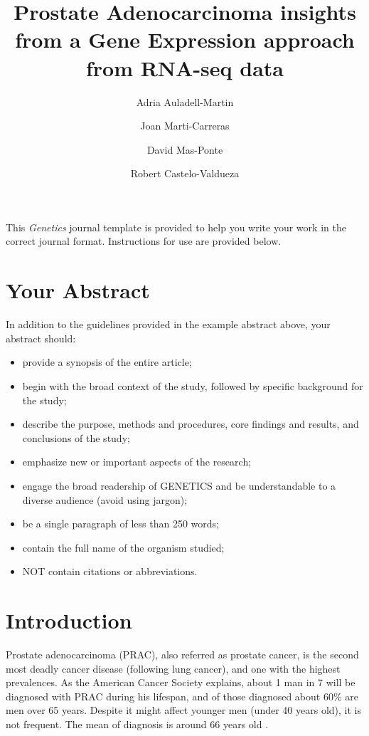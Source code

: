 \documentclass[9pt,twocolumn,twoside]{gsajnl}
\title{Prostate Adenocarcinoma insights from a Gene Expression approach from RNA-seq data}
\author[$\ast$,$\dagger$]{Adria Auladell-Martin}
\author[$\ast$,$\dagger$]{Joan Marti-Carreras}
\author[$\ast$,$\dagger$]{David Mas-Ponte}
\author[$\ast$,1]{Robert Castelo-Valdueza}
\affil[$\ast$]{M.Sc. in Bioinformatics at Department of Experimental and Health Sciences (CEXS), Universitat Pompeu Fabra}
\affil[$\dagger$]{Authors Contributed Equally to this work}
\begin{document}
\maketitle
\thispagestyle{firststyle}
\marginmark
\firstpagefootnote
{}
\vspace{-11pt}%

\lettrine[lines=2]{\color{color2}T}{}his \textit{Genetics} journal template is provided to help you write your work in the correct journal format. Instructions for use are provided below.

\section*{Your Abstract}

In addition to the guidelines provided in the example abstract above, your abstract should:

\begin{itemize}
\item provide a synopsis of the entire article;
\item begin with the broad context of the study, followed by specific background for the study;
\item describe the purpose, methods and procedures, core findings and results, and conclusions of the study;
\item emphasize new or important aspects of the research;
\item engage the broad readership of GENETICS and be understandable to a diverse audience (avoid using jargon);
\item be a single paragraph of less than 250 words;
\item contain the full name of the organism studied;
\item NOT contain citations or abbreviations.
\end{itemize}


\section*{Introduction}
Prostate adenocarcinoma (PRAC), also referred as prostate cancer, is  the second most deadly cancer disease (following lung cancer), and one with the highest prevalences. As the American Cancer Society explains, about 1 man in 7 will be diagnosed with PRAC during his lifespan, and of those diagnosed about 60\% are men over 65 years. Despite it might affect younger men (under 40 years old), it is not frequent. The mean of diagnosis is around 66 years old \cite{prostatestatistics}.
\end{document}

